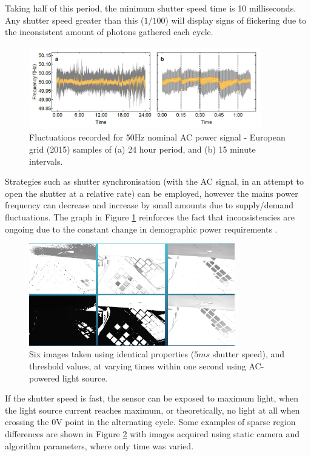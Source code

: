\documentclass[fleqn,twoside,12pt]{report}
\begin{document}
Taking half of this period, the minimum shutter speed time is 10 milliseconds. Any shutter speed greater than this ($1/100$) will display signs of flickering due to the inconsistent amount of photons gathered each cycle. 


\begin{figure}[h]
	\centering
	\includegraphics[width=0.9\textwidth]{50hz.jpg}
	\caption{Fluctuations recorded for 50Hz nominal AC power signal - European grid (2015) samples of (a) 24 hour period, and (b) 15 minute intervals.}
	\label{fig:50hz}
\end{figure}

Strategies such as shutter synchronisation (with the AC signal, in an attempt to open the shutter at a relative rate) can be employed, however the mains power frequency can decrease and increase by small amounts due to supply/demand fluctuations. The graph in Figure \ref{fig:50hz} reinforces the fact that inconsistencies are ongoing due to the constant change in demographic power requirements \cite{50hz}.

\begin{figure}[h]
	\centering
	\includegraphics[width=0.8\textwidth]{flicker.png}
	\caption{Six images taken using identical properties ($5ms$ shutter speed), and threshold values, at varying times within one second using AC-powered light source.}
	\label{fig:flicker}
\end{figure}





If the shutter speed is fast, the sensor can be exposed to maximum light, when the light source current reaches maximum, or theoretically, no light at all when crossing the 0V point in the alternating cycle. Some examples of sparse region differences are shown in Figure \ref{fig:flicker} with images acquired using static camera and algorithm parameters, where only time was varied.
\end{document}

